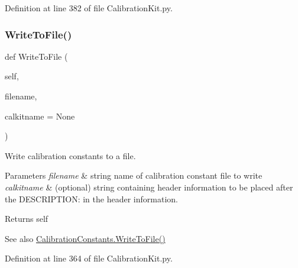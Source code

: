 Definition at line 382 of file Calibration\+Kit.\+py.

\mbox{\label{classSignalIntegrity_1_1Measurement_1_1CalKit_1_1CalibrationKit_1_1CalibrationKit_ac68713cc133371d7a733dd318b5669d3}} 
\subsubsection{\texorpdfstring{Write\+To\+File()}{WriteToFile()}}
{\footnotesize\ttfamily def Write\+To\+File (\begin{DoxyParamCaption}\item[{}]{self,  }\item[{}]{filename,  }\item[{}]{calkitname = {\ttfamily None} }\end{DoxyParamCaption})}



Write calibration constants to a file. 


\begin{DoxyParams}{Parameters}
{\em filename} & string name of calibration constant file to write \\
\hline
{\em calkitname} & (optional) string containing header information to be placed after the D\+E\+S\+C\+R\+I\+P\+T\+I\+ON\+: in the header information. \\
\hline
\end{DoxyParams}
\begin{DoxyReturn}{Returns}
self 
\end{DoxyReturn}
\begin{DoxySeeAlso}{See also}
\hyperlink{classSignalIntegrity_1_1Measurement_1_1CalKit_1_1CalibrationKit_1_1CalibrationConstants_ac68713cc133371d7a733dd318b5669d3}{Calibration\+Constants.\+Write\+To\+File()} 
\end{DoxySeeAlso}


Definition at line 364 of file Calibration\+Kit.\+py.



